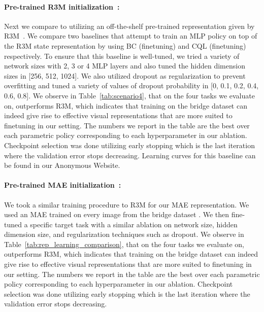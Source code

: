 \documentclass[../thesis.tex]{subfiles}
\begin{document}
\paragraph{Pre-trained R3M initialization~\citep{nair2022r3m}:} Next we compare \ptrmethodname to utilizing an off-the-shelf pre-trained representation given by R3M~\citep{nair2022r3m}. We compare two baselines that attempt to train an MLP policy on top of the R3M state representation by using BC (finetuning) and CQL (finetuning) respectively. To ensure that this baseline is well-tuned, we tried a variety of network sizes with 2, 3 or 4 MLP layers and also tuned the hidden dimension sizes in [256, 512, 1024]. We also utilized dropout as regularization to prevent overfitting and tuned a variety of values of dropout probability in [0, 0.1, 0.2, 0.4, 0.6, 0.8]. We observe in Table~\ref{tab:scenario4}, that on the four tasks we evaluate on, \ptrmethodname outperforms R3M, which indicates that training on the bridge dataset can indeed give rise to effective visual representations that are more suited to finetuning in our setting. The numbers we report in the table are the best over each parametric policy corresponding to each hyperparameter in our ablation. Checkpoint selection was done utilizing early stopping which is the last iteration where the validation error stops decreasing. Learning curves for this baseline can be found in our Anonymous Website.

\paragraph{Pre-trained MAE initialization~\citep{he2111masked}:}
We took a similar training procedure to R3M for our MAE representation. We used an MAE trained on every image from the bridge dataset \citet{ebert2021bridge}. We then fine-tuned a specific target task with a similar ablation on network size, hidden dimension size, and regularization techniques such as dropout.  We observe in Table~\ref{tab:rep_learning_comparison}, that on the four tasks we evaluate on, \ptrmethodname outperforms R3M, which indicates that training on the bridge dataset can indeed give rise to effective visual representations that are more suited to finetuning in our setting. The numbers we report in the table are the best over each parametric policy corresponding to each hyperparameter in our ablation. Checkpoint selection was done utilizing early stopping which is the last iteration where the validation error stops decreasing. 
\end{document}
